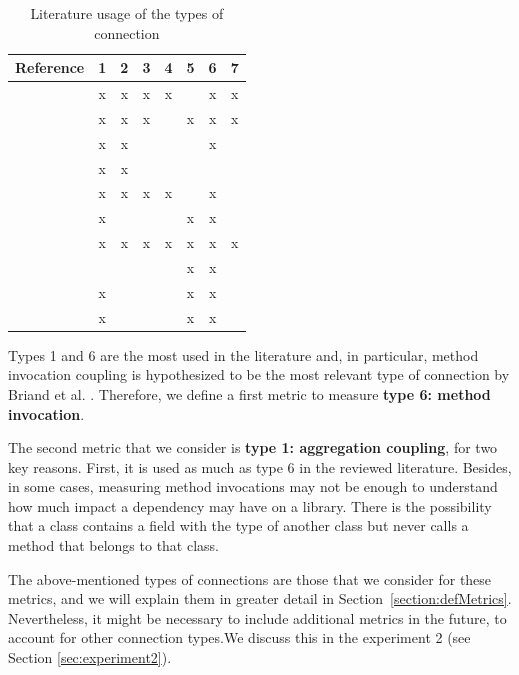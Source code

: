 \begin{table}[ht!]
    \centering
    \begin{tabular}{|l|c|c|c|c|c|c|c|}
         \hline
         Reference                      & 1 & 2 & 3 & 4 & 5 & 6 & 7 \\\hline
         \cite{eder1994coupling}        & x & x & x & x &   & x & x \\\hline
         \cite{hitz1995measuring}       & x & x & x &   & x & x & x \\\hline
         \cite{briand1997investigation} & x & x &   &   &   & x &   \\\hline
         \cite{wilkie2000coupling}      & x & x &   &   &   &   &   \\\hline
         \cite{yang2005detecting}       & x & x & x & x &   & x &   \\\hline
         \cite{gui2007ranking}          & x &   &   &   & x & x &   \\\hline
         \cite{gupta2009package}        & x & x & x & x & x & x & x \\\hline
         \cite{harrison1998coupling}    &   &   &   &   & x & x &   \\\hline
         \cite{du2004refactoring}       & x &   &   &   & x & x &   \\\hline
         \cite{koetter2019assessing}    & x &   &   &   & x & x &   \\\hline
    \end{tabular}
    \caption{Literature usage of the types of connection}
    \label{tab:type-con-literature}
\end{table}

Types 1 and 6 are the most used in the literature and, in particular, method invocation coupling is
hypothesized to be the most relevant type of connection by Briand et al. \cite{briand1999unified}. Therefore, we define a first metric to measure \textbf{type 6: method invocation}.

The second metric that we consider is \textbf{type 1: aggregation coupling}, for two key reasons. First, it is used as much as type 6 in the reviewed literature. Besides, in some cases, measuring method invocations may not be enough to understand how much impact a dependency may have on a library. There is the possibility that a class contains a field with the type of another class but never calls a method that belongs to that class.

The above-mentioned types of connections are those that we consider for these metrics, and we will explain them in greater detail in Section~\ref{section:defMetrics}. Nevertheless, it might be necessary to include additional metrics in the future, to account for other connection types.We discuss this in the experiment 2 (see Section \ref{sec:experiment2}).

